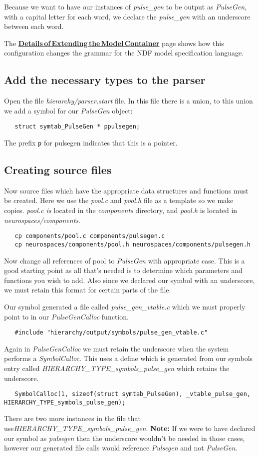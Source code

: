 \documentclass[12pt]{article}
\begin{document}
Because we want to have our instances of {\it pulse\_gen} to be output as {\it PulseGen}, with a capital letter for each word, we declare the  {\it pulse\_gen} with an underscore between each word.

The \href{../genesis-extend-model-container-detail/genesis-extend-model-container-detail.tex}{\bf Details\,of\,Extending\,the\,Model\,Container} page shows how this configuration changes the grammar for the NDF model specification language.

\subsection*{Add the necessary types to the parser}

Open the file {\it hierarchy/parser.start} file. In this file there is a union, to this union we add a symbol for our {\it PulseGen} object:
\begin{verbatim}
   struct symtab_PulseGen * ppulsegen;
\end{verbatim}
The prefix {\tt p} for pulsegen indicates that this is a pointer.

\subsection*{Creating source files}

Now source files which have the appropriate data structures and functions must be created. Here we use the {\it pool.c} and {\it pool.h} file as a template so we make copies. {\it pool.c is} located in the {\it components} directory, and {\it pool.h} is located in {\it neurospaces/components}.
\begin{verbatim}
   cp components/pool.c components/pulsegen.c
   cp neurospaces/components/pool.h neurospaces/components/pulsegen.h
\end{verbatim}
Now change all references of pool to {\it PulseGen} with appropriate case. This is a good starting point as all that's needed is to determine which parameters and functions you wish to add. Also since we declared our symbol with an underscore, we must retain this format for certain parts of the file.

Our symbol generated a file called {\it pulse\_gen\_vtable.c} which we must properly point to in our {\it PulseGenCalloc} function.
\begin{verbatim}
   #include "hierarchy/output/symbols/pulse_gen_vtable.c"
\end{verbatim}
Again in {\it PulseGenCalloc} we must retain the underscore when the system performs a {\it SymbolCalloc}. This uses a define which is generated from our symbols entry called {\it HIERARCHY\_TYPE\_symbols\_pulse\_gen} which retains the underscore.
\begin{verbatim}
   SymbolCalloc(1, sizeof(struct symtab_PulseGen), _vtable_pulse_gen, HIERARCHY_TYPE_symbols_pulse_gen);
\end{verbatim}
There are two more instances in the file that use{\it HIERARCHY\_TYPE\_symbols\_pulse\_gen}. {\bf Note:} If we were to have declared our symbol as {\it pulsegen} then the underscore wouldn't be needed in those cases, however our generated file calls would reference {\it Pulsegen} and not {\it PulseGen}.
\end{document}
